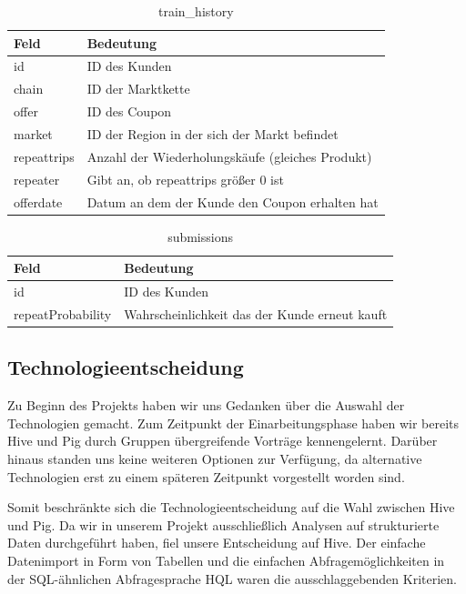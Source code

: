 \begin{table}[h]
\centering
\begin{tabular}{l|l}
	\textbf{Feld} & \textbf{Bedeutung}  \\ 
	\hline id & ID des Kunden \\ 
	\hline chain & ID der Marktkette \\ 
	\hline offer  & ID des Coupon  \\ 
	\hline market & ID der Region in der sich der Markt befindet  \\ 
	\hline repeattrips & Anzahl der Wiederholungskäufe (gleiches Produkt)  \\ 
	\hline repeater & Gibt an, ob repeattrips größer 0 ist \\ 
	\hline offerdate & Datum an dem der Kunde den Coupon erhalten hat 
	\vspace{0.3cm} \\ 
\end{tabular} 
\caption{train\_history}
\label{tab:trainhistory}
\end{table}

\begin{table}[h]
	\centering
\begin{tabular}{l|l}
	\textbf{Feld} & \textbf{Bedeutung}  \\ 
	\hline id & ID des Kunden \\ 
	\hline repeatProbability & Wahrscheinlichkeit das der Kunde erneut kauft 
	\vspace{0.3cm} \\
\end{tabular} 
\caption{submissions}
\label{tab:submissions}
\end{table}

\subsection{Technologieentscheidung}
Zu Beginn des Projekts haben wir uns Gedanken über die Auswahl der Technologien gemacht. Zum Zeitpunkt der Einarbeitungsphase haben wir bereits Hive und Pig durch Gruppen übergreifende Vorträge kennengelernt. Darüber hinaus standen uns keine weiteren Optionen zur Verfügung, da alternative Technologien erst zu einem späteren Zeitpunkt vorgestellt worden sind.

Somit beschränkte sich die Technologieentscheidung auf die Wahl zwischen Hive und Pig. Da wir in unserem Projekt ausschließlich Analysen auf strukturierte Daten durchgeführt haben, fiel unsere Entscheidung auf Hive. Der einfache Datenimport in Form von Tabellen und die einfachen Abfragemöglichkeiten in der SQL-ähnlichen Abfragesprache HQL waren die ausschlaggebenden Kriterien.

